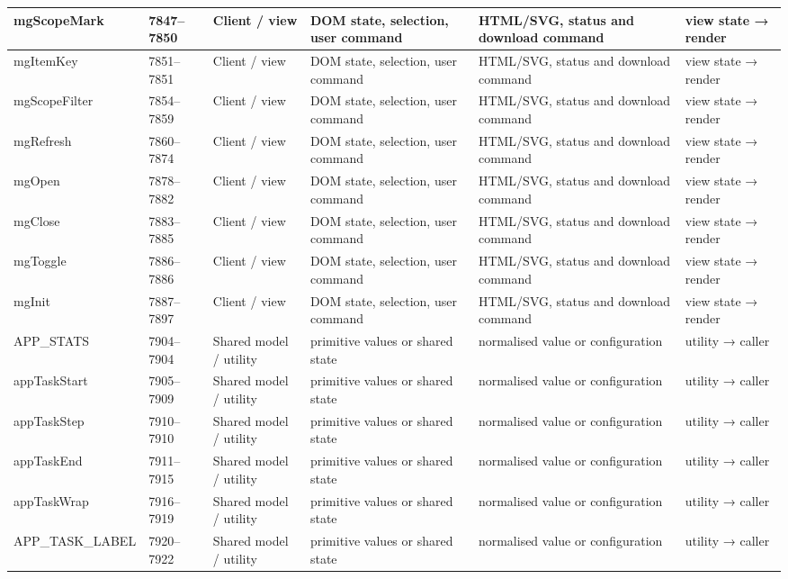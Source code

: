 \begin{landscape}
\begin{longtable}{@{}p{3.2cm}p{1.45cm}p{2.7cm}p{4.0cm}p{4.0cm}p{3.0cm}@{}}
mgScopeMark & 7847--7850 & Client / view & DOM state, selection, user command & HTML/SVG, status and download command & view state → render \\\hline
mgItemKey & 7851--7851 & Client / view & DOM state, selection, user command & HTML/SVG, status and download command & view state → render \\\hline
mgScopeFilter & 7854--7859 & Client / view & DOM state, selection, user command & HTML/SVG, status and download command & view state → render \\\hline
mgRefresh & 7860--7874 & Client / view & DOM state, selection, user command & HTML/SVG, status and download command & view state → render \\\hline
mgOpen & 7878--7882 & Client / view & DOM state, selection, user command & HTML/SVG, status and download command & view state → render \\\hline
mgClose & 7883--7885 & Client / view & DOM state, selection, user command & HTML/SVG, status and download command & view state → render \\\hline
mgToggle & 7886--7886 & Client / view & DOM state, selection, user command & HTML/SVG, status and download command & view state → render \\\hline
mgInit & 7887--7897 & Client / view & DOM state, selection, user command & HTML/SVG, status and download command & view state → render \\\hline
APP\_STATS & 7904--7904 & Shared model / utility & primitive values or shared state & normalised value or configuration & utility → caller \\\hline
appTaskStart & 7905--7909 & Shared model / utility & primitive values or shared state & normalised value or configuration & utility → caller \\\hline
appTaskStep & 7910--7910 & Shared model / utility & primitive values or shared state & normalised value or configuration & utility → caller \\\hline
appTaskEnd & 7911--7915 & Shared model / utility & primitive values or shared state & normalised value or configuration & utility → caller \\\hline
appTaskWrap & 7916--7919 & Shared model / utility & primitive values or shared state & normalised value or configuration & utility → caller \\\hline
APP\_TASK\_LABEL & 7920--7922 & Shared model / utility & primitive values or shared state & normalised value or configuration & utility → caller \\\hline

\end{longtable}
\end{landscape}
